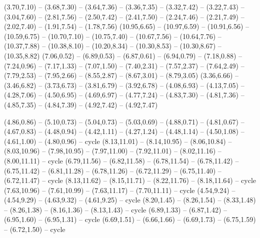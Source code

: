 \expandafter\def\csname geo:fluss:Ruhr\endcsname{
  (3.70,7.10) -- (3.68,7.30) -- (3.64,7.36) -- (3.36,7.35) -- (3.32,7.42) -- (3.22,7.43) -- (3.04,7.60) -- (2.81,7.56) -- (2.50,7.42) -- (2.41,7.50) -- (2.24,7.46) -- (2.21,7.49) -- (2.02,7.40) -- (1.91,7.54) -- (1.78,7.56)}
\expandafter\def\csname geo:fluss:Neisse\endcsname{
  (10.95,6.65) -- (10.97,6.59) -- (10.91,6.56) -- (10.59,6.75) -- (10.70,7.10) -- (10.75,7.40) -- (10.67,7.56) -- (10.64,7.76) -- (10.37,7.88) -- (10.38,8.10) -- (10.20,8.34) -- (10.30,8.53) -- (10.30,8.67) -- (10.35,8.82)}
\expandafter\def\csname geo:fluss:Isar\endcsname{
  (7.06,0.52) -- (6.89,0.53) -- (6.87,0.61) -- (6.94,0.79) -- (7.18,0.88) -- (7.24,0.96) -- (7.17,1.33) -- (7.07,1.50) -- (7.40,2.31) -- (7.57,2.37) -- (7.64,2.49) -- (7.79,2.53) -- (7.95,2.66) -- (8.55,2.87) -- (8.67,3.01) -- (8.79,3.05)}
\expandafter\def\csname geo:fluss:Fulda\endcsname{
  (3.36,6.66) -- (3.46,6.82) -- (3.73,6.73) -- (3.81,6.79) -- (3.92,6.78) -- (4.08,6.93) -- (4.13,7.05) -- (4.28,7.06) -- (4.50,6.95) -- (4.69,6.97) -- (4.77,7.24) -- (4.83,7.30) -- (4.81,7.36) -- (4.85,7.35) -- (4.84,7.39) -- (4.92,7.42) -- (4.92,7.47)}

\expandafter\def\csname geo:see:Bodensee\endcsname{
  (4.86,0.86) -- (5.10,0.73) -- (5.04,0.73) -- (5.03,0.69) -- (4.88,0.71) -- (4.81,0.67) -- (4.67,0.83) -- (4.48,0.94) -- (4.42,1.11) -- (4.27,1.24) -- (4.48,1.14) -- (4.50,1.08) -- (4.61,1.00) -- (4.80,0.96) -- cycle}
\expandafter\def\csname geo:see:Mueritz\endcsname{
  (8.13,11.01) -- (8.14,10.95) -- (8.06,10.84) -- (8.03,10.96) -- (7.98,10.95) -- (7.97,11.00) -- (7.92,11.01) -- (8.02,11.16) -- (8.00,11.11) -- cycle}
\expandafter\def\csname geo:see:SchwerinerSee\endcsname{
  (6.79,11.56) -- (6.82,11.58) -- (6.78,11.54) -- (6.78,11.42) -- (6.75,11.42) -- (6.81,11.28) -- (6.78,11.26) -- (6.72,11.29) -- (6.75,11.40) -- (6.72,11.47) -- cycle}
\expandafter\def\csname geo:see:KummerowerSee\endcsname{
  (8.13,11.62) -- (8.15,11.71) -- (8.22,11.76) -- (8.18,11.64) -- cycle}
\expandafter\def\csname geo:see:PlauerSee\endcsname{
  (7.63,10.96) -- (7.61,10.99) -- (7.63,11.17) -- (7.70,11.11) -- cycle}
\expandafter\def\csname geo:see:SteinhuderMeer\endcsname{
  (4.54,9.24) -- (4.54,9.29) -- (4.63,9.32) -- (4.61,9.25) -- cycle}
\expandafter\def\csname geo:see:Chiemsee\endcsname{
  (8.20,1.45) -- (8.26,1.54) -- (8.33,1.48) -- (8.26,1.38) -- (8.16,1.36) -- (8.13,1.43) -- cycle}
\expandafter\def\csname geo:see:StarnbergerSee\endcsname{
  (6.89,1.33) -- (6.87,1.42) -- (6.95,1.60) -- (6.95,1.31) -- cycle}
\expandafter\def\csname geo:see:Ammersee\endcsname{
  (6.69,1.51) -- (6.66,1.66) -- (6.69,1.73) -- (6.75,1.59) -- (6.72,1.50) -- cycle}

